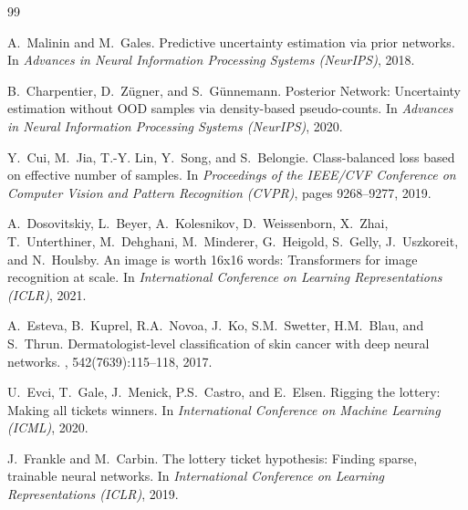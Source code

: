 \documentclass[letterpaper]{article} %
\begin{document}
\begin{thebibliography}{99}

A.~Malinin and M.~Gales.
\newblock Predictive uncertainty estimation via prior networks.
\newblock In {\em Advances in Neural Information Processing Systems (NeurIPS)}, 2018.

B.~Charpentier, D.~Z{\"u}gner, and S.~G{\"u}nnemann.
\newblock Posterior Network: Uncertainty estimation without OOD samples via density-based pseudo-counts.
\newblock In {\em Advances in Neural Information Processing Systems (NeurIPS)}, 2020.

Y.~Cui, M.~Jia, T.-Y. Lin, Y.~Song, and S.~Belongie.
\newblock Class-balanced loss based on effective number of samples.
\newblock In {\em Proceedings of the IEEE/CVF Conference on Computer Vision and Pattern Recognition (CVPR)}, pages 9268--9277, 2019.

A.~Dosovitskiy, L.~Beyer, A.~Kolesnikov, D.~Weissenborn, X.~Zhai, T.~Unterthiner, M.~Dehghani, M.~Minderer, G.~Heigold, S.~Gelly, J.~Uszkoreit, and N.~Houlsby.
\newblock An image is worth 16x16 words: Transformers for image recognition at scale.
\newblock In {\em International Conference on Learning Representations (ICLR)}, 2021.

A.~Esteva, B.~Kuprel, R.A.~Novoa, J.~Ko, S.M.~Swetter, H.M.~Blau, and S.~Thrun.
\newblock Dermatologist-level classification of skin cancer with deep neural networks.
, 542(7639):115--118, 2017.

U.~Evci, T.~Gale, J.~Menick, P.S.~Castro, and E.~Elsen.
\newblock Rigging the lottery: Making all tickets winners.
\newblock In {\em International Conference on Machine Learning (ICML)}, 2020.

J.~Frankle and M.~Carbin.
\newblock The lottery ticket hypothesis: Finding sparse, trainable neural networks.
\newblock In {\em International Conference on Learning Representations (ICLR)}, 2019.


\end{thebibliography}
\end{document}
